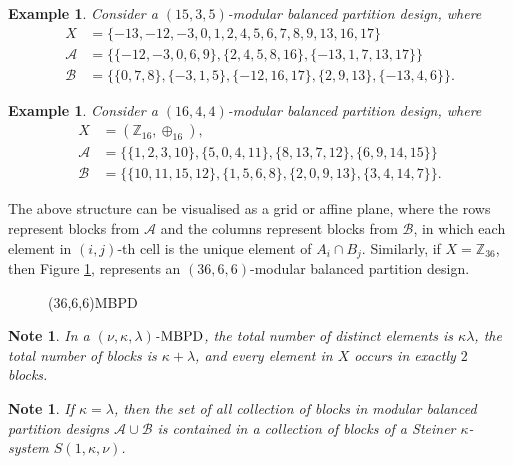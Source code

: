 \documentclass[preprint,11pt]{elsarticle}
\newcommand{\MBPD}{\textnormal{MBPD}}
\newtheorem{example}[theorem]{Example}
\newtheorem{note}[theorem]{Note}
\begin{document}
\begin{example} Consider a $(15, 3,5)$-modular balanced partition design, where \begin{align*}
    X&  = \{-13, -12, -3, 0, 1, 2, 4, 5, 6, 7, 8, 9 , 13, 16, 17\} \\
    \mathcal{A}  & =\{\{-12, -3, 0, 6, 9\}, \{2, 4, 5, 8, 16\}, \{-13, 1, 7, 13, 17\} \}\\
    \mathcal{B}  & = \{\{0,7,8\}, \{-3,1,5\}, \{-12,16,17\}, \{2,9,13\}, \{-13,4,6\}\}.
\end{align*}

\end{example}
\begin{example} Consider a  $(16, 4,4)$-modular balanced partition design, where  \begin{align*}
    X&  =(\mathbb{Z}_{16}, \oplus_{16}),\\ 
    \mathcal{A} &  =\{\{1,2,3,10\}, \{5,0,4,11\},\{8,13,7,12\},\{6,9,14,15\}\}\\
    \mathcal{B} &  = \{\{10,11,15,12\}, \{1,5,6,8\},\{2,0,9,13\}, \{3,4,14,7\} \}.
\end{align*}
\end{example}
The above structure can be visualised as a grid or affine plane, where the rows represent blocks from $\mathcal{A}$ and the columns represent blocks from $\mathcal{B}$, in which  each element in $(i,j)$-th cell is the unique element of $A_i\cap B_j$.
Similarly, if $X=\mathbb{Z}_{36}$, then Figure \ref{fig:7.1}, represents an $(36,6,6)$-modular balanced partition design.
\begin{figure}[h]
    \centering
    \caption{(36,6,6)\text{-}\MBPD }
    \label{fig:7.1}
\end{figure}

\begin{note}
     In a $(\nu, \kappa, \lambda)$-$\MBPD$, the total number of distinct elements is $\kappa\lambda$, the total number of blocks is $\kappa+\lambda$, and every element in $X$ occurs in exactly $2$ blocks.
\end{note}
\begin{note}
    If $\kappa=\lambda$, then the set of all collection of blocks in modular balanced partition designs $ \mathcal{A}\cup \mathcal{B}$ is contained in a collection of blocks of a Steiner $\kappa$-system $S(1,\kappa, \nu)$.  
\end{note}
\end{document}
